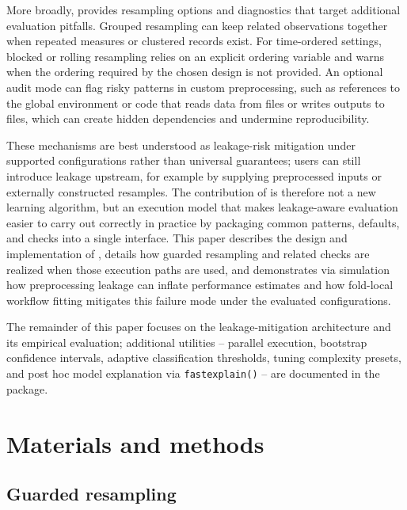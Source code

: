 More broadly,  provides resampling options and diagnostics that target additional evaluation pitfalls. Grouped resampling can keep related observations together when repeated measures or clustered records exist. For time-ordered settings, blocked or rolling resampling relies on an explicit ordering variable and  warns when the ordering required by the chosen design is not provided. An optional audit mode can flag risky patterns in custom preprocessing, such as references to the global environment or code that reads data from files or writes outputs to files, which can create hidden dependencies and undermine reproducibility.

These mechanisms are best understood as leakage-risk mitigation under supported configurations rather than universal guarantees; users can still introduce leakage upstream, for example by supplying preprocessed inputs or externally constructed resamples. The contribution of  is therefore not a new learning algorithm, but an execution model that makes leakage-aware evaluation easier to carry out correctly in practice by packaging common patterns, defaults, and checks into a single interface. This paper describes the design and implementation of , details how guarded resampling and related checks are realized when those execution paths are used, and demonstrates via simulation how preprocessing leakage can inflate performance estimates and how fold-local workflow fitting mitigates this failure mode under the evaluated configurations.

The remainder of this paper focuses on the leakage-mitigation architecture and its empirical evaluation; additional utilities -- parallel execution, bootstrap confidence intervals, adaptive classification thresholds, tuning complexity presets, and post hoc model explanation via \texttt{fastexplain()} -- are documented in the package.

\section{Materials and methods}\label{materials-and-methods}

\subsection{Guarded resampling}\label{sec:guarded-resampling}

